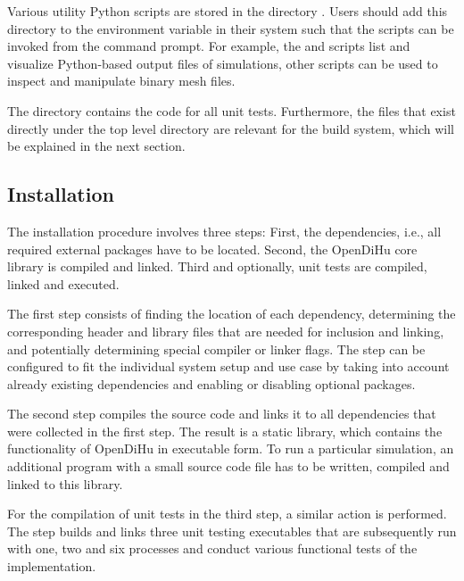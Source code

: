 Various utility Python scripts are stored in the directory . Users should add this directory to the  environment variable in their system such that the scripts can be invoked from the command prompt. For example, the  and  scripts list and visualize Python-based output files of simulations, other scripts can be used to inspect and manipulate binary mesh files.

The directory  contains the code for all unit tests. Furthermore, the files that exist directly under the top level  directory are relevant for the build system, which will be explained in the next section.

\subsection{Installation}\label{sec:installation}

The installation procedure involves three steps: First, the dependencies, i.e., all required external packages have to be located. Second, the OpenDiHu core library is compiled and linked. Third and optionally, unit tests are compiled, linked and executed.

The first step consists of finding the location of each dependency, determining the corresponding header and library files that are needed for inclusion and linking, and potentially determining special compiler or linker flags. The step can be configured to fit the individual system setup and use case by taking into account already existing dependencies and enabling or disabling optional packages.

The second step compiles the source code and links it to all dependencies that were collected in the first step. The result is a static library, which contains the functionality of OpenDiHu in executable form. To run a particular simulation, an additional program with a small source code file has to be written, compiled and linked to this library.

For the compilation of unit tests in the third step, a similar action is performed. The step builds and links three unit testing executables that are subsequently run with one, two and six processes and conduct various functional tests of the implementation.

